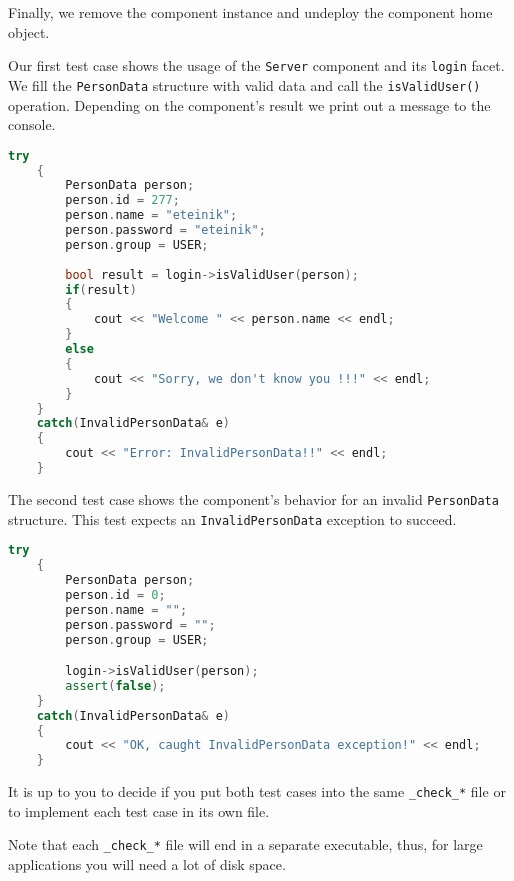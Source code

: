 \vspace{3mm}
Finally, we remove the component instance and undeploy the component home object.


\vspace{3mm}
Our first test case shows the usage of the {\tt Server} component and its 
{\tt login} facet. 
We fill the {\tt PersonData} structure with valid data and call the
{\tt isValidUser()} operation. Depending on the component's result we print out
a message to the console.

\begin{footnotesize}
\begin{lstlisting}[language=C++]
    try 
    {
        PersonData person;
        person.id = 277;
        person.name = "eteinik";
        person.password = "eteinik";
        person.group = USER;
	
        bool result = login->isValidUser(person);
        if(result) 
        {
            cout << "Welcome " << person.name << endl;
        }
        else 
        {
            cout << "Sorry, we don't know you !!!" << endl;
        }
    }
    catch(InvalidPersonData& e) 
    {
        cout << "Error: InvalidPersonData!!" << endl;
    }
\end{lstlisting}
\end{footnotesize}

The second test case shows the component's behavior for an invalid 
{\tt PersonData} structure. This test expects an {\tt InvalidPersonData}
exception to succeed.

\begin{footnotesize}
\begin{lstlisting}[language=C++]
    try 
    {
        PersonData person;
        person.id = 0;
        person.name = "";
        person.password = "";
        person.group = USER;

        login->isValidUser(person);
        assert(false);
    }
    catch(InvalidPersonData& e) 
    {
        cout << "OK, caught InvalidPersonData exception!" << endl;
    }
\end{lstlisting}
\end{footnotesize}

It is up to you to decide if you put both test cases into the same {\tt \_check\_*}
file or to implement each test case in its own file.

\vspace{3mm}
Note that each {\tt \_check\_*} file will end in a separate executable, thus,
for large applications you will need a lot of disk space.

